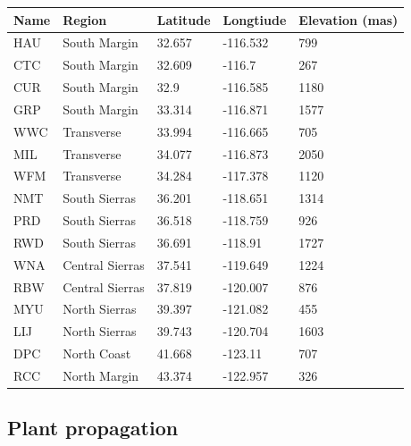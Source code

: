 \documentclass[11pt, oneside]{article}
\begin{document}

\begin{table}[ht]
   \centering
   \begin{tabular}{@{} lllll @{}}
      \toprule
  Name& Region  & Latitude  & Longtiude  & Elevation (mas) \\
      \midrule
	HAU & South Margin & 32.657	& 
    -116.532	& 799   \\
	CTC	& South Margin & 32.609 & 
    -116.7	& 267   \\
	CUR	& South Margin & 32.9 & 
    -116.585	& 1180   \\
	GRP & South Margin & 33.314 &
    -116.871	& 1577   \\
	WWC &	Transverse & 33.994 & 
    -116.665	& 705   \\
	MIL	& Transverse & 34.077 & 
    -116.873	& 2050   \\
	WFM	& Transverse & 34.284 & 
    -117.378	& 1120   \\
	NMT	& South Sierras & 36.201 & 
    -118.651	& 1314   \\
	PRD	& South Sierras & 36.518 & 
    -118.759	& 926   \\
	RWD	& South Sierras & 36.691 & 
    -118.91	& 1727   \\
	WNA	& Central Sierras & 37.541 & 
    -119.649	& 1224   \\
	RBW	& Central Sierras	& 37.819 & 
    -120.007	& 876   \\
	MYU	& North Sierras	& 39.397 & 
    -121.082	& 455   \\
	LIJ	& North Sierras	& 39.743 & 
    -120.704	& 1603   \\
	DPC	& North Coast & 41.668 & 
    -123.11	& 707   \\
	RCC	& North Margin & 43.374 & 
    -122.957	& 326   \\
	\bottomrule
	\end{tabular}
	\label{table:Table_FocalPops}
\end{table}

\subsection*{Plant propagation}
\end{document}
